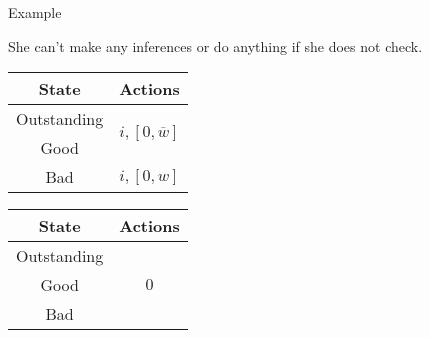 \documentclass[usenames,dvipsnames,aspectratio=169,11pt, envcountsect, handout]{beamer}
\begin{document}
\begin{frame}{Example}

	She can't make any inferences or do anything if she does not check.

	\vfill

	\begin{table}[H]
		\centering
		\begin{minipage}{0.29\textwidth}

		\end{minipage}\hspace{0.3cm} %
		\begin{minipage}{0.29\textwidth}
			\centering
			\begin{tabular}{c | c}
				State                             & Actions                                                                        \\
				\hline
				{\color{bleudefrance}Outstanding} & \multirow{2}{*}{{\color{bleudefrance}\( i, \left[ 0, \overline{w} \right] \)}} \\
				{\color{bleudefrance}Good}        &                                                                                \\
				Bad                               & \(  i, \left[0, w \right] \)                                                   \\
			\end{tabular}
			\vspace{0.5cm} %
		\end{minipage}\hspace{0.7cm} %
		\begin{minipage}{0.29\textwidth}
			\centering
			\begin{tabular}{c | c}
				State       & Actions                   \\
				\hline
				Outstanding & \multirow{3}{*}{ \( 0 \)} \\
				Good        &                           \\
				Bad         &                           \\
			\end{tabular}
			\vspace{0.5cm} %
		\end{minipage}
	\end{table}

\end{frame}
\end{document}
